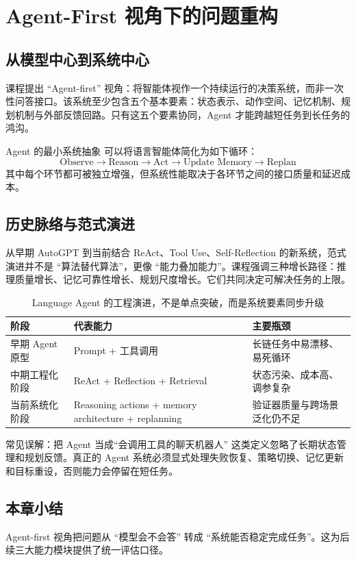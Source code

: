 \section{Agent-First 视角下的问题重构}

\subsection{从模型中心到系统中心}
课程提出 ``Agent-first'' 视角：将智能体视作一个持续运行的决策系统，而非一次性问答接口。该系统至少包含五个基本要素：状态表示、动作空间、记忆机制、规划机制与外部反馈回路。只有这五个要素协同，Agent 才能跨越短任务到长任务的鸿沟。

\begin{knowledgebox}{Agent 的最小系统抽象}
可以将语言智能体简化为如下循环：
\[
\text{Observe} \rightarrow \text{Reason} \rightarrow \text{Act} \rightarrow \text{Update Memory} \rightarrow \text{Replan}
\]
其中每个环节都可被独立增强，但系统性能取决于各环节之间的接口质量和延迟成本。
\end{knowledgebox}

\subsection{历史脉络与范式演进}
从早期 AutoGPT 到当前结合 ReAct、Tool Use、Self-Reflection 的新系统，范式演进并不是 ``算法替代算法''，更像 ``能力叠加能力''。课程强调三种增长路径：推理质量增长、记忆可靠性增长、规划尺度增长。它们共同决定可解决任务的上限。

\begin{table}[H]
\centering
\begin{tabular}{p{2.5cm}p{4.2cm}p{4.7cm}}
\toprule
\textbf{阶段} & \textbf{代表能力} & \textbf{主要瓶颈} \\
\midrule
早期 Agent 原型 & Prompt + 工具调用 & 长链任务中易漂移、易死循环 \\
中期工程化阶段 & ReAct + Reflection + Retrieval & 状态污染、成本高、调参复杂 \\
当前系统化阶段 & Reasoning actions + memory architecture + replanning & 验证器质量与跨场景泛化仍不足 \\
\bottomrule
\end{tabular}
\caption{Language Agent 的工程演进，不是单点突破，而是系统要素同步升级}
\end{table}

\begin{warningbox}{常见误解：把 Agent 当成“会调用工具的聊天机器人”}
这类定义忽略了长期状态管理和规划反馈。真正的 Agent 系统必须显式处理失败恢复、策略切换、记忆更新和目标重设，否则能力会停留在短任务。
\end{warningbox}

\subsection{本章小结}
Agent-first 视角把问题从 ``模型会不会答'' 转成 ``系统能否稳定完成任务''。这为后续三大能力模块提供了统一评估口径。

